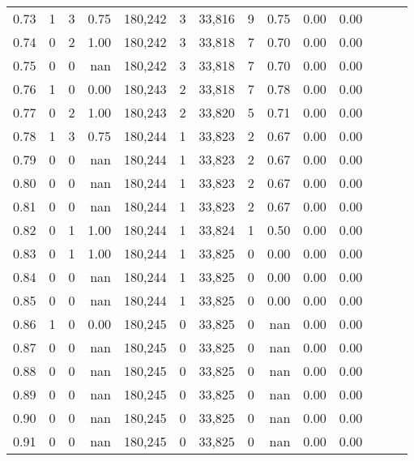 \begin{tabular}{rrrrrrrrrrrrrr}
0.73 &      1 &      3 &  0.75 &  180,242 &        3 &  33,816 &       9 &  0.75 &  0.00 &      0.00 \\
0.74 &      0 &      2 &  1.00 &  180,242 &        3 &  33,818 &       7 &  0.70 &  0.00 &      0.00 \\
0.75 &      0 &      0 &   nan &  180,242 &        3 &  33,818 &       7 &  0.70 &  0.00 &      0.00 \\
0.76 &      1 &      0 &  0.00 &  180,243 &        2 &  33,818 &       7 &  0.78 &  0.00 &      0.00 \\
0.77 &      0 &      2 &  1.00 &  180,243 &        2 &  33,820 &       5 &  0.71 &  0.00 &      0.00 \\
0.78 &      1 &      3 &  0.75 &  180,244 &        1 &  33,823 &       2 &  0.67 &  0.00 &      0.00 \\
0.79 &      0 &      0 &   nan &  180,244 &        1 &  33,823 &       2 &  0.67 &  0.00 &      0.00 \\
0.80 &      0 &      0 &   nan &  180,244 &        1 &  33,823 &       2 &  0.67 &  0.00 &      0.00 \\
0.81 &      0 &      0 &   nan &  180,244 &        1 &  33,823 &       2 &  0.67 &  0.00 &      0.00 \\
0.82 &      0 &      1 &  1.00 &  180,244 &        1 &  33,824 &       1 &  0.50 &  0.00 &      0.00 \\
0.83 &      0 &      1 &  1.00 &  180,244 &        1 &  33,825 &       0 &  0.00 &  0.00 &      0.00 \\
0.84 &      0 &      0 &   nan &  180,244 &        1 &  33,825 &       0 &  0.00 &  0.00 &      0.00 \\
0.85 &      0 &      0 &   nan &  180,244 &        1 &  33,825 &       0 &  0.00 &  0.00 &      0.00 \\
0.86 &      1 &      0 &  0.00 &  180,245 &        0 &  33,825 &       0 &   nan &  0.00 &      0.00 \\
0.87 &      0 &      0 &   nan &  180,245 &        0 &  33,825 &       0 &   nan &  0.00 &      0.00 \\
0.88 &      0 &      0 &   nan &  180,245 &        0 &  33,825 &       0 &   nan &  0.00 &      0.00 \\
0.89 &      0 &      0 &   nan &  180,245 &        0 &  33,825 &       0 &   nan &  0.00 &      0.00 \\
0.90 &      0 &      0 &   nan &  180,245 &        0 &  33,825 &       0 &   nan &  0.00 &      0.00 \\
0.91 &      0 &      0 &   nan &  180,245 &        0 &  33,825 &       0 &   nan &  0.00 &      0.00 \\

\end{tabular}
